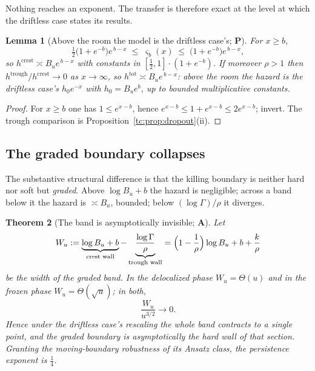 \documentclass[11pt]{article}
\numberwithin{equation}{section}
\theoremstyle{plain}
\newtheorem{theorem}{Theorem}[section]
\newtheorem{lemma}[theorem]{Lemma}
\theoremstyle{definition}
\theoremstyle{remark}
\begin{document}
\noindent Nothing reaches an exponent. The transfer is therefore exact
at the level at which the driftless case states its results.

\begin{lemma}[Above the room the model is the driftless case's; \textbf{P}]
\label{tc:lem:aboveroom}
For $x\ge b$,
\begin{equation}\label{tc:eq:sandwich}
\tfrac12\bigl(1+e^{-b}\bigr)e^{\,b-x}\;\le\;\varsigma_b(x)\;\le\;
\bigl(1+e^{-b}\bigr)e^{\,b-x},
\end{equation}
so $h^{\mathrm{crest}}\asymp B_ue^{\,b-x}$ with constants in
$[\tfrac12,1]\cdot(1+e^{-b})$. If moreover $\rho>1$ then
$h^{\mathrm{trough}}/h^{\mathrm{crest}}\to0$ as $x\to\infty$, so
$h^{\mathrm{tot}}\asymp B_ue^{\,b-x}$: above the room the hazard is
the driftless case's $h_{0}e^{-x}$ with $h_{0}=B_ue^{b}$, up to bounded
multiplicative constants.
\end{lemma}

\begin{proof}
For $x\ge b$ one has $1\le e^{x-b}$, hence
$e^{x-b}\le1+e^{x-b}\le2e^{x-b}$; invert. The trough comparison is
Proposition~\ref{tc:prop:dropout}(ii).
\end{proof}

\subsection{The graded boundary collapses}\label{tc:subsub:collapse}

The substantive structural difference is that the killing boundary is
neither hard nor soft but \emph{graded}. Above $\log B_u+b$ the hazard
is negligible; across a band below it the hazard is $\asymp B_u$,
bounded; below $(\log\Gamma)/\rho$ it diverges.

\begin{theorem}[The band is asymptotically invisible; \textbf{A}]
\label{tc:thm:collapse}
Let
\begin{equation}\label{tc:eq:band}
W_u:=\underbrace{\log B_u+b}_{\text{crest wall}}
-\underbrace{\frac{\log\Gamma}{\rho}}_{\text{trough wall}}
=\Bigl(1-\frac1\rho\Bigr)\log B_u+b+\frac{k}{\rho}
\end{equation}
be the width of the graded band. In the delocalized phase
$W_u=\Theta(u)$ and in the frozen phase $W_u=\Theta(\sqrt u)$; in both,
\[
\frac{W_u}{u^{3/2}}\longrightarrow0 .
\]
Hence under the driftless case's rescaling the whole band contracts to a single
point, and the graded boundary is asymptotically the hard wall of that
section. Granting the moving-boundary robustness of its Ansatz class,
the persistence exponent is $\tfrac14$.
\end{theorem}
\end{document}
